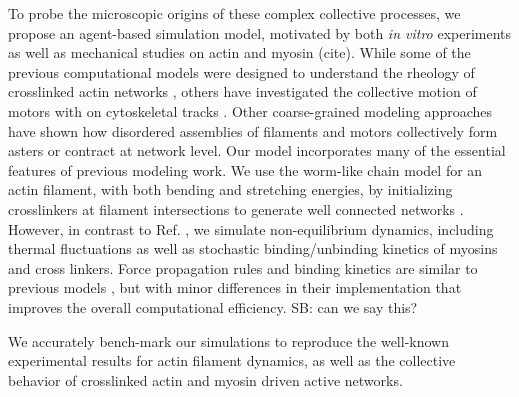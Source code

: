 \documentclass[11pt]{article}
\begin{document}
\par
To probe the microscopic origins of these complex {\color{red}collective processes}, we {\color{red}propose} an {\color{red}agent-based} simulation model, motivated by both {\em in vitro} experiments as well as {\color{red}{\it in vivo} mechanical studies on} actin and myosin {\color{red}(cite)}. {\color{red}While some of the previous computational} models were designed to understand the rheology of crosslinked actin networks 
\cite{mackintosh1995,head2003,wilhelm2003,kim2009}, {\color{red}others have investigated the collective} motion of motors 
with {\color{red}on cytoskeletal tracks} \cite{nedelec2007,erdmann2012,stam2015}. {\color{red}Other coarse-grained modeling approaches} have shown how disordered assemblies of filaments and motors collectively form asters \cite{gordon2012} or 
contract {\color{red}at network level}\cite{wang2012,dasanyake2011,kim2014,ennomani2016}. Our model {\color{red}incorporates} many of the {\color{red}essential} features of {\color{red}previous modeling work}. We use the {\color{red}worm-like chain model} for an actin filament, {\color{red}with both} bending and stretching {\color{red}energies}, by initializing crosslinkers at {\color{red}filament} intersections to {\color{red}generate} well connected networks \cite{head2003}. {\color{red}However,} in contrast to Ref. \cite{head2003, dasanyake2011}, we simulate non-equilibrium dynamics, including {\color{red}thermal} fluctuations {\color{red}as well as stochastic} binding/unbinding {\color{red}kinetics of} myosins and cross linkers.  
Force propagation rules and binding kinetics {\color{red}are} similar to {\color{red}previous models}
\cite{nedelec2007, gordon2012}, but with {\color{red}minor} differences in {\color{red}their implementation that improves the overall computational efficiency}. {\color{blue}SB: can we say this?}
\par
{\color{red}We accurately} bench-mark {\color{red}our simulations} to reproduce {\color{red}the well}-known experimental results for actin
filament {\color{red}dynamics}, {\color{red}as well as the collective behavior} of crosslinked actin and myosin {\color{red}driven} active networks. 
\end{document}
